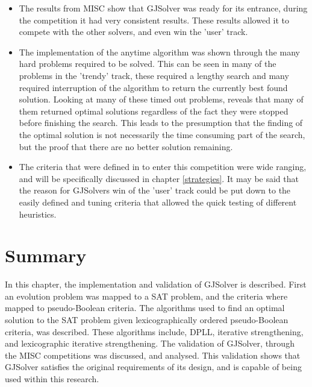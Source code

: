\begin{itemize}
  \item The results from MISC show that GJSolver was ready for its entrance, during the competition it had very consistent results.
These results allowed it to compete with the other solvers, and even win the 'user' track.
\item The implementation of the anytime algorithm was shown through the many hard problems required to be solved.
This can be seen in many of the problems in the 'trendy' track, these required a lengthy search and many required interruption of the algorithm to return the currently best found solution.
Looking at many of these timed out problems, reveals that many of them returned optimal solutions regardless of the fact they were stopped before finishing the search.
This leads to the presumption that the finding of the optimal solution is not necessarily the time consuming part of the search, but the proof that there are no better solution remaining.
\item The criteria that were defined in to enter this competition were wide ranging, and will be specifically discussed in chapter \ref{strategies}.
It may be said that the reason for GJSolvers win of the 'user' track could be put down to the easily defined and tuning criteria that allowed the quick testing of different heuristics.
\end{itemize}

\section{Summary}
In this chapter, the implementation and validation of GJSolver is described.
First an evolution problem was mapped to a SAT problem, and the criteria where mapped to pseudo-Boolean criteria.
The algorithms used to find an optimal solution to the SAT problem given lexicographically ordered pseudo-Boolean criteria, was described.
These algorithms include, DPLL, iterative strengthening, and lexicographic iterative strengthening.
The validation of GJSolver, through the MISC competitions was discussed, and analysed.
This validation shows that GJSolver satisfies the original requirements of its design, and is capable of being used within this research. 
